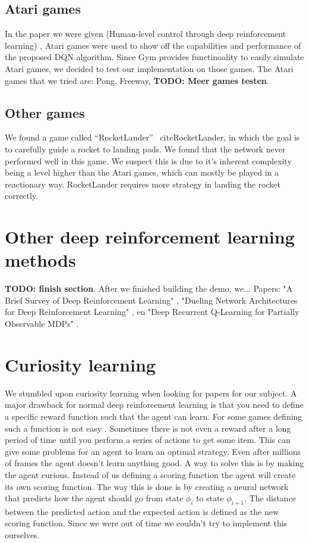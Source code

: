\documentclass[12pt, conference, compsoc]{IEEEtran}
\begin{document}
\subsection{Atari games}
In the paper we were given (Human-level control through deep reinforcement learning) \cite{mnih2015humanlevel}, Atari games were used to show off the capabilities and performance of the proposed DQN algorithm. Since Gym provides functinoality to easily simulate Atari games, we decided to test our implementation on those games. The Atari games that we tried are: Pong, Freeway, \textbf{TODO: Meer games testen}.

\subsection{Other games}
We found a game called ``RocketLander'' \   cite{RocketLander}, in which the goal is to carefully guide a rocket to landing pads. We found that the network never performed well in this game. We suspect this is due to it's inherent complexity being a level higher than the Atari games, which can mostly be played in a reactionary way. RocketLander requires more strategy in landing the rocket correctly.

\section{Other deep reinforcement learning methods}
\textbf{TODO: finish section}.
After we finished building the demo, we...
Papers: "A Brief Survey of Deep Reinforcement Learning" \cite{brief-survey}, "Dueling Network Architectures for Deep Reinforcement Learning" \cite{dueling}, en "Deep Recurrent Q-Learning for Partially Observable MDPs" \cite{drqn}.

\section{Curiosity learning}
We stumbled upon curiosity learning when looking for papers for our subject. A major drawback for normal deep reinforcement learning is that you need to define a specific reward function such that the agent can learn. For some games defining such a function is not easy \cite{YoutubeMontezuma}. Sometimes there is not even a reward after a long period of time until you perform a series of actions to get some item. This can give some problems for an agent to learn an optimal strategy. Even after millions of frames the agent doesn't learn anything good. A way to solve this is by making the agent curious. Instead of us defining a scoring function the agent will create its own scoring function. The way this is done is by creating a neural network that predicts how the agent should go from state $\phi_i$ to state $\phi_{i+1}$. The distance between the predicted action and the expected action is defined as the new scoring function. Since we were out of time we couldn't try to implement this ourselves.
\end{document}
